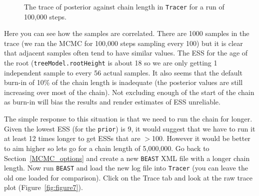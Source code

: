 \documentclass[cup7b, english]{cupbook}
\begin{document}
\begin{figure}[htbp]
\begin{center}
\leavevmode
{}
\end{center}
\caption{The trace of posterior against chain length in \texttt{Tracer} for a run of 100,000 steps.}
\label{fig:figure6}
\end{figure}

Here you can see how the samples are correlated. There are 1000 samples in the trace
(we ran the MCMC for 100,000 steps sampling every 100) but it is clear that adjacent
samples often tend to have similar values. The ESS for the age of the root (\texttt{treeModel.rootHeight}
is about 18 so we are only getting 1 independent sample to every 56 actual samples. It also seems
that the default burn-in of 10\% of the chain length is inadequate (the posterior values
are still increasing over most of the chain). Not excluding enough
of the start of the chain as burn-in will bias the results and render estimates of ESS
unreliable.

The simple response to this situation is that we need to run the chain for longer. Given the lowest
ESS (for the \texttt{prior}) is 9, it would suggest that we have to run it at least 12
times longer to get ESSs that are $>$100. However it would be better to aim higher so lets
go for a chain length of 5,000,000. Go back to Section~\ref{MCMC_options}
and create a new \texttt{BEAST} XML file with a longer chain length. Now run \texttt{BEAST} and load the new
log file into \texttt{Tracer} (you can leave the old one loaded for comparison). Click on the Trace
tab and look at the raw trace plot (Figure~\ref{fig:figure7}).
\end{document}
